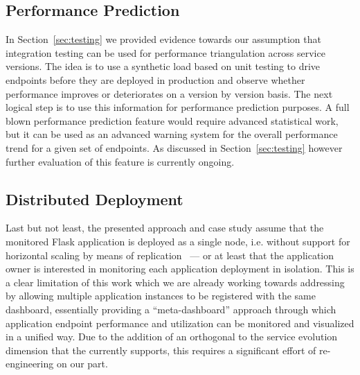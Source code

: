 



  \subsection*{Performance Prediction}

	In Section~\ref{sec:testing} we provided evidence towards our assumption that integration testing can be used for performance triangulation across service versions. The idea is to use a synthetic load based on unit testing to drive endpoints before they are deployed in production and observe whether performance improves or deteriorates on a version by version basis. The next logical step is to use this information for performance prediction purposes. A full blown performance prediction feature would require advanced statistical work, but it can be used as an advanced warning system for the overall performance trend for a given set of endpoints. As discussed in Section~\ref{sec:testing} however further evaluation of this feature is currently ongoing.

  \subsection*{Distributed Deployment}

	Last but not least, the presented approach and case study assume that the monitored Flask application is deployed as a single node, i.e. without support for horizontal scaling by means of replication~\cite{vaquero2011dynamically}  --- or at least that the application owner is interested in monitoring each application deployment in isolation. This is a clear limitation of this work which we are already working towards addressing by allowing multiple application instances to be registered with the same dashboard, essentially providing a ``meta-dashboard'' approach through which application endpoint performance and utilization can be monitored and visualized in a unified way. Due to the addition of an orthogonal to the service evolution dimension that the \tool currently supports, this requires a significant effort of re-engineering on our part.   
	
